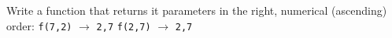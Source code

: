 \begin{Exercise}[title={Integer ordering},difficulty=3]
\label{ex:ordering function}
\Question Write a function that returns it parameters in the right,
numerical (ascending) order:\newline 
\lstinline{f(7,2)} $\rightarrow$ \lstinline{2,7}\newline
\lstinline{f(2,7)} $\rightarrow$ \lstinline{2,7}\newline
\end{Exercise}

\begin{Answer}
\Question

\end{Answer}


